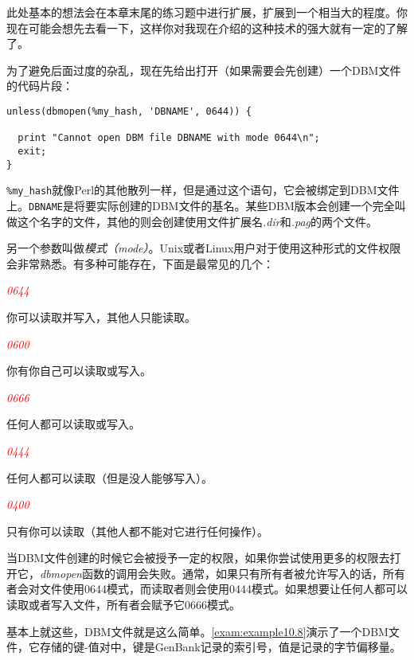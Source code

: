 此处基本的想法会在本章末尾的练习题中进行扩展，扩展到一个相当大的程度。你现在可能会想先去看一下，这样你对我现在介绍的这种技术的强大就有一定的了解了。

为了避免后面过度的杂乱，现在先给出打开（如果需要会先创建）一个DBM文件的代码片段：

\begin{lstlisting}
unless(dbmopen(%my_hash, 'DBNAME', 0644)) {
  
  print "Cannot open DBM file DBNAME with mode 0644\n";
  exit;
}
\end{lstlisting}

\verb|%my_hash|就像Perl的其他散列一样，但是通过这个语句，它会被绑定到DBM文件上。\verb|DBNAME|是将要实际创建的DBM文件的基名。某些DBM版本会创建一个完全叫做这个名字的文件，其他的则会创建使用文件扩展名\textit{.dir}和\textit{.pag}的两个文件。

另一个参数叫做\textit{模式（mode）}。Unix或者Linux用户对于使用这种形式的文件权限会非常熟悉。有多种可能存在，下面是最常见的几个：

\textcolor{red}{\textit{0644}}
\begin{adjustwidth}{1cm}{}
你可以读取并写入，其他人只能读取。
\end{adjustwidth}

\textcolor{red}{\textit{0600}}
\begin{adjustwidth}{1cm}{}
你有你自己可以读取或写入。
\end{adjustwidth}

\textcolor{red}{\textit{0666}}
\begin{adjustwidth}{1cm}{}
任何人都可以读取或写入。
\end{adjustwidth}

\textcolor{red}{\textit{0444}}
\begin{adjustwidth}{1cm}{}
任何人都可以读取（但是没人能够写入）。
\end{adjustwidth}

\textcolor{red}{\textit{0400}}
\begin{adjustwidth}{1cm}{}
只有你可以读取（其他人都不能对它进行任何操作）。
\end{adjustwidth}

当DBM文件创建的时候它会被授予一定的权限，如果你尝试使用更多的权限去打开它，\textit{dbmopen}函数的调用会失败。通常，如果只有所有者被允许写入的话，所有者会对文件使用0644模式，而读取者则会使用0444模式。如果想要让任何人都可以读取或者写入文件，所有者会赋予它0666模式。

基本上就这些，DBM文件就是这么简单。\autoref{exam:example10.8}演示了一个DBM文件，它存储的键-值对中，键是GenBank记录的索引号，值是记录的字节偏移量。

